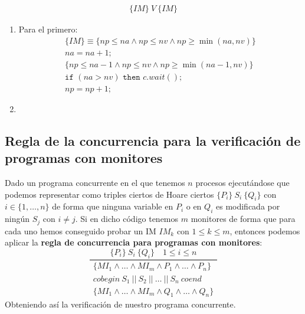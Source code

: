 \begin{ejercicio}
\begin{gather*}
        \{IM\}\ V\ \{IM\}
    \end{gather*}
    \begin{enumerate}
        \item Para el primero: 
            \begin{gather*}
                \{IM\} \equiv \{np \leq na \land np \leq nv \land np \geq \min(na,nv)\} \\
                na = na + 1; \\
                \{np \leq na-1 \land np \leq nv \land np \geq \min(na-1,nv)\}  \\
                \texttt{if\ } (na > nv) \texttt{\ then\ } c.wait(); \\
                np = np + 1; 
            \end{gather*}
        \item 
    \end{enumerate}
\end{ejercicio}

\subsection{Regla de la concurrencia para la verificación de programas con monitores}
Dado un programa concurrente en el que tenemos $n$ procesos ejecutándose que podemos representar como triples ciertos de Hoare ciertos $\{P_i\}\ S_i\ \{Q_i\}$ con $i \in \{1, \ldots, n\}$ de forma que ninguna variable en $P_i$ o en $Q_i$ es modificada por ningún $S_j$ con $i\neq j$. Si en dicho código tenemos $m$ monitores de forma que para cada uno hemos conseguido probar un IM $IM_k$ con $1 \leq k \leq m$, entonces podemos aplicar la \textbf{regla de concurrencia para programas con monitores}:
\begin{equation*}
    \dfrac{\{P_i\}\ S_i\ \{Q_i\} \quad 1 \leq i \leq n}{
        \begin{array}{c}
            \{MI_1 \land \ldots \land MI_m \land P_1 \land \ldots\land P_n\} \\
            cobegin\ S_1\ ||\ S_2\ ||\ \ldots\ ||\ S_n\ coend \\
            \{MI_1 \land \ldots \land MI_m \land Q_1 \land  \ldots\land Q_n\} 
        \end{array}
    }
\end{equation*}
Obteniendo así la verificación de nuestro programa concurrente.
